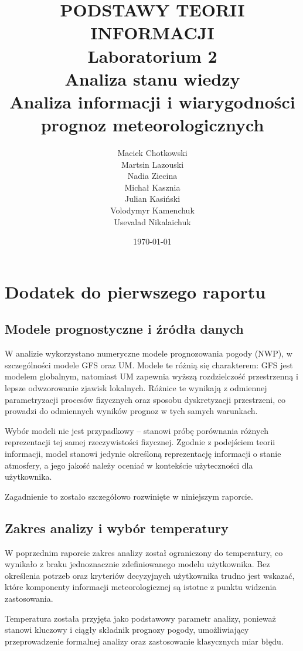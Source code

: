 \documentclass[a4paper,12pt]{article}
\title{
    \vspace{1.5cm}
    \textbf{PODSTAWY TEORII INFORMACJI}\\
    \vspace{1.5cm}
    Laboratorium 2\\
    Analiza stanu wiedzy\\
    \vspace{1.5cm}
    \huge \textbf{Analiza informacji i wiarygodności prognoz meteorologicznych}\\
    \vspace{1cm}
}
\author{
    Maciek Chotkowski \\ Martsin Lazouski \\ Nadia Ziecina \\
    Michał Kasznia \\ Julian Kasiński \\ Volodymyr Kamenchuk \\ Usevalad Nikalaichuk 
}
\date{\today}
\begin{document}
\maketitle
\newpage

\tableofcontents
\newpage

\setcounter{section}{-1}
\section{Dodatek do pierwszego raportu}

\subsection{Modele prognostyczne i źródła danych}

W analizie wykorzystano numeryczne modele prognozowania pogody (NWP), w szczególności modele GFS oraz UM. Modele te różnią się charakterem: GFS jest modelem globalnym, natomiast UM zapewnia wyższą rozdzielczość przestrzenną i lepsze odwzorowanie zjawisk lokalnych. Różnice te wynikają z odmiennej parametryzacji procesów fizycznych oraz sposobu dyskretyzacji przestrzeni, co prowadzi do odmiennych wyników prognoz w tych samych warunkach.

Wybór modeli nie jest przypadkowy – stanowi próbę porównania różnych reprezentacji tej samej rzeczywistości fizycznej. Zgodnie z podejściem teorii informacji, model stanowi jedynie określoną reprezentację informacji o stanie atmosfery, a jego jakość należy oceniać w kontekście użyteczności dla użytkownika.

Zagadnienie to zostało szczegółowo rozwinięte w niniejszym raporcie.


\subsection{Zakres analizy i wybór temperatury}

W poprzednim raporcie zakres analizy został ograniczony do temperatury, co wynikało z braku jednoznacznie zdefiniowanego modelu użytkownika. Bez określenia potrzeb oraz kryteriów decyzyjnych użytkownika trudno jest wskazać, które komponenty informacji meteorologicznej są istotne z punktu widzenia zastosowania.

Temperatura została przyjęta jako podstawowy parametr analizy, ponieważ stanowi kluczowy i ciągły składnik prognozy pogody, umożliwiający przeprowadzenie formalnej analizy oraz zastosowanie klasycznych miar błędu.
\end{document}

